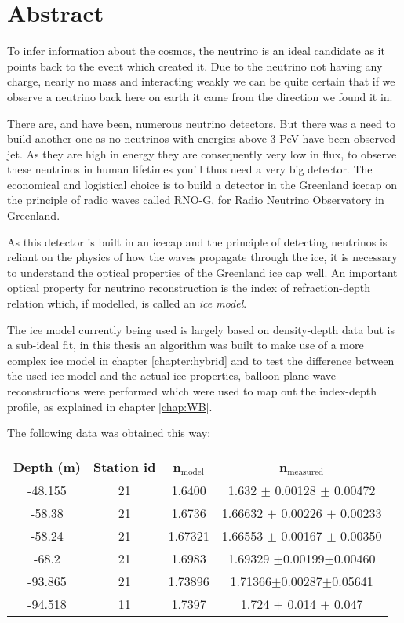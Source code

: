 \chapter*{Abstract}
To infer information about the cosmos, the neutrino is an ideal candidate as it
points back to the event which created it.  Due to the neutrino not having any charge,
nearly no mass and interacting weakly we can be quite certain that if we
observe a neutrino back here on earth it came from the direction we found it in.

There are, and have been, numerous neutrino detectors. But there was a need to
build another one as no neutrinos with energies above 3 PeV have been
observed jet. As they are high in energy they are consequently very low in flux, to
observe these neutrinos in human lifetimes you'll thus need a very big
detector.  The economical and logistical choice is to build a detector in the
Greenland icecap on the principle of radio waves called RNO-G, for
Radio Neutrino Observatory in Greenland.

As this detector is built in an icecap and the principle of detecting neutrinos is reliant
on the physics of how the waves propagate through the ice, it is necessary to understand 
the optical properties of the Greenland ice cap well. An important optical property
for neutrino reconstruction is the index of refraction-depth relation which, if modelled,
is called an \textit{ice model}.

The ice model currently being used is largely based on density-depth data but is 
a sub-ideal fit, in this thesis an algorithm was built to make use of a more complex
ice model in chapter \ref{chapter:hybrid} and to test the difference between the
used ice model and the actual ice properties, balloon plane wave reconstructions were
performed which were used to map out the index-depth profile, as explained in chapter \ref{chap:WB}.

The following data was obtained this way:
\begin{center}
\begin{tabular}{||c c c c||}
 \hline
 Depth (m) & Station id & n$_\text{model}$ & n$_\text{measured}$\\ [0.5ex]
 \hline\hline
 -48.155 & 21 & 1.6400 & 1.632 $\pm$ 0.00128 $\pm$ 0.00472\\
 -58.38 & 21 & 1.6736 & 1.66632 $\pm$ 0.00226 $\pm$ 0.00233 \\
 -58.24 & 21 & 1.67321 & 1.66553 $\pm$ 0.00167 $\pm$ 0.00350 \\
 -68.2 & 21 & 1.6983 & 1.69329 $\pm$0.00199$\pm$0.00460 \\
 -93.865 & 21 & 1.73896 & 1.71366$\pm$0.00287$\pm$0.05641\\
 -94.518 & 11 & 1.7397 & 1.724 $\pm$ 0.014 $\pm$ 0.047 \\
 \hline
\end{tabular}
\end{center}
\newpage
